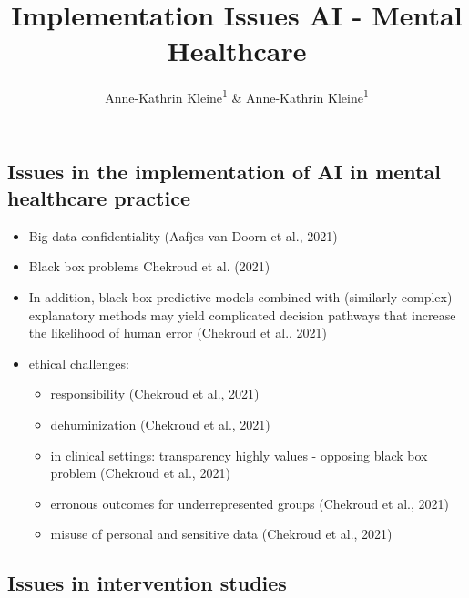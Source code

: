 \documentclass[
  man]{apa7}
\title{Implementation Issues AI - Mental Healthcare}
\author{Anne-Kathrin Kleine\textsuperscript{1} \& Anne-Kathrin Kleine\textsuperscript{1}}
\date{}
\affiliation{\vspace{0.5cm}\textsuperscript{1} LMU\\\textsuperscript{} }
\providecommand{\tightlist}{%
  \setlength{\itemsep}{0pt}\setlength{\parskip}{0pt}}
\begin{document}
\maketitle

\hypertarget{issues-in-the-implementation-of-ai-in-mental-healthcare-practice}{%
\subsection{Issues in the implementation of AI in mental healthcare practice}\label{issues-in-the-implementation-of-ai-in-mental-healthcare-practice}}

\begin{itemize}
\tightlist
\item
  Big data confidentiality (Aafjes-van Doorn et al., 2021)
\item
  Black box problems Chekroud et al. (2021)
\item
  In addition, black-box predictive models combined with (similarly complex) explanatory methods may yield complicated decision pathways that increase the likelihood of human error (Chekroud et al., 2021)
\item
  ethical challenges:

  \begin{itemize}
  \tightlist
  \item
    responsibility (Chekroud et al., 2021)
  \item
    dehuminization (Chekroud et al., 2021)
  \item
    in clinical settings: transparency highly values - opposing black box problem (Chekroud et al., 2021)
  \item
    erronous outcomes for underrepresented groups (Chekroud et al., 2021)
  \item
    misuse of personal and sensitive data (Chekroud et al., 2021)
  \end{itemize}
\end{itemize}

\hypertarget{issues-in-intervention-studies}{%
\subsection{Issues in intervention studies}\label{issues-in-intervention-studies}}
\end{document}
